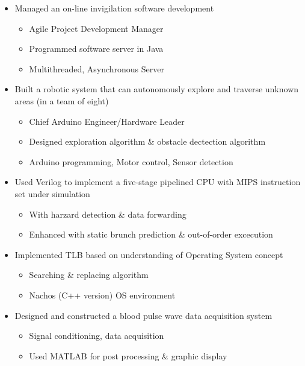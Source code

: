 \documentclass[a4paper, 12pt]{article}
\newenvironment{changemargin}[2]{%
  \begin{list}{}{%
      \setlength{\topsep}{0pt}%
      \setlength{\leftmargin}{#1}%
      \setlength{\rightmargin}{#2}%
      \setlength{\listparindent}{\parindent}%
      \setlength{\itemindent}{\parindent}%
      \setlength{\parsep}{\parskip}%
    }%
  \item[]}{\end{list}
}
\newenvironment{body}
{
\vspace*{-16pt}
\begin{changemargin}{-0.25in}{-0.5in}
}	
{
\end{changemargin}
}
\begin{document}
\begin{body}
  \vspace{14pt}
  \begin{itemize} \itemsep 1pt
  \item Managed an on-line invigilation software development
    \begin{itemize} \itemsep -0pt \small
        \item Agile Project Development Manager
        \item Programmed software server in Java
        \item Multithreaded, Asynchronous Server
    \end{itemize}
  \item Built a robotic system that can autonomously explore and traverse unknown areas (in a team of eight)
    \begin{itemize} \itemsep -0pt \small
        \item Chief Arduino Engineer/Hardware Leader
        \item Designed exploration algorithm \& obstacle dectection algorithm
        \item Arduino programming, Motor control, Sensor detection
    \end{itemize}
  \item Used Verilog to implement a five-stage pipelined CPU with MIPS instruction set under simulation
    \begin{itemize} \itemsep -0pt \small
        \item With harzard detection \& data forwarding
        \item Enhanced with static brunch prediction \& out-of-order excecution
    \end{itemize}
  \item Implemented TLB based on understanding of Operating System concept
    \begin{itemize} \itemsep -0pt \small
        \item Searching \& replacing algorithm
        \item Nachos (C++ version) OS environment
    \end{itemize}
  \item Designed and constructed a blood pulse wave data acquisition system
    \begin{itemize} \itemsep -0pt \small
        \item Signal conditioning, data acquisition
        \item Used MATLAB for post processing \& graphic display
    \end{itemize}
  \end{itemize}
\end{body}
\end{document}
